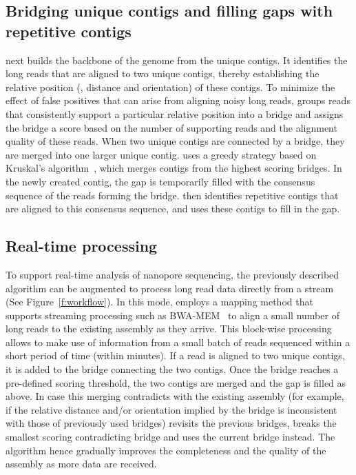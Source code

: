 \subsection{Bridging unique contigs and filling gaps with repetitive contigs}
\npscarf{} next builds the backbone of the genome from the unique contigs.
It identifies the long reads that are aligned to two unique contigs, thereby
establishing the relative position (\IE, distance and orientation) of these
contigs. To minimize the effect of false positives that can arise from
aligning noisy long reads, \npscarf{} groups reads that consistently support
a particular relative position into a bridge and assigns the bridge 
a score based on the number of supporting reads and the alignment quality of
these reads. When two unique contigs are connected by a bridge, they are merged
into one larger unique contig. \npscarf{} uses a greedy strategy based on 
Kruskal's algorithm~\cite{Kruskal1956}, which merges contigs from the highest
scoring bridges. In the newly created contig, the gap is temporarily filled with
the consensus sequence of the reads forming the bridge. \npscarf{} then identifies
repetitive contigs that are aligned to this consensus sequence, and uses these
contigs to fill in the gap.


\subsection{Real-time processing}
To support real-time analysis of nanopore sequencing, the previously described
algorithm can be augmented to process long read data directly from a stream
(See Figure~\ref{f:workflow}).
In this mode, \npscarf{} employs a mapping method that supports streaming
processing such as BWA-MEM~\cite{Li2013} to align a small number of long reads
to the existing assembly as they arrive. This block-wise processing allows
\npscarf{} to make use of information from a small batch of reads sequenced
within a short period of time (within minutes). If a read is aligned to two
unique contigs, it is added to the bridge connecting the two contigs. Once the bridge
reaches a pre-defined scoring threshold,
the two contigs are merged and the gap is filled as above. 
In case this merging contradicts with the existing assembly (for example, if the
relative distance and/or orientation implied by the bridge is inconsistent with 
those of previously used bridges) \npscarf{} revisits the previous bridges, breaks
the smallest scoring contradicting bridge and uses the current bridge instead. 
The algorithm hence gradually improves the completeness and the quality of the 
assembly as more data are received.

